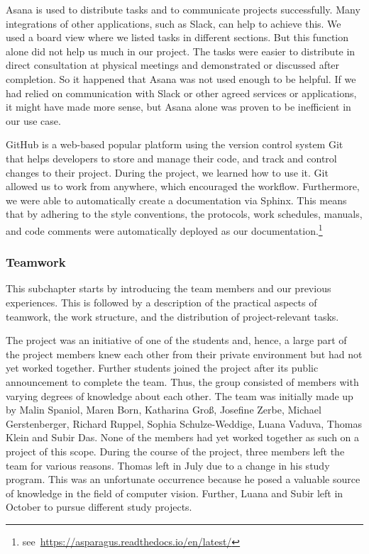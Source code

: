Asana is used to distribute tasks and to communicate projects successfully. Many integrations of other applications, such as Slack, can help to achieve this. We used a board view where we listed tasks in different sections. But this function alone did not help us much in our project. The tasks were easier to distribute in direct consultation at physical meetings and demonstrated or discussed after completion. So it happened that Asana was not used enough to be helpful. If we had relied on communication with Slack or other agreed services or applications, it might have made more sense, but Asana alone was proven to be inefficient in our use case.

GitHub is a web-based popular platform using the version control system Git that helps developers to store and manage their code, and track and control changes to their project. During the project, we learned how to use it. Git allowed us to work from anywhere, which encouraged the workflow. Furthermore, we were able to automatically create a documentation via Sphinx. This means that by adhering to the style conventions, the protocols, work schedules, manuals, and code comments were automatically deployed as our documentation.\footnote{see~\url{https://asparagus.readthedocs.io/en/latest/}}


\subsubsection{Teamwork}
\label{subsec:Teamwork}

This subchapter starts by introducing the team members and our previous experiences. This is followed by a description of the practical aspects of teamwork, the work structure, and the distribution of project-relevant tasks.

\bigskip
The project was an initiative of one of the students and, hence, a large part of the project members knew each other from their private environment but had not yet worked together. Further students joined the project after its public announcement to complete the team. Thus, the group consisted of members with varying degrees of knowledge about each other. The team was initially made up by Malin Spaniol, Maren Born, Katharina Groß, Josefine Zerbe, Michael Gerstenberger, Richard Ruppel, Sophia Schulze-Weddige, Luana Vaduva, Thomas Klein and Subir Das. None of the members had yet worked together as such on a project of this scope. During the course of the project, three members left the team for various reasons. Thomas left in July due to a change in his study program. This was an unfortunate occurrence because he posed a valuable source of knowledge in the field of computer vision. Further, Luana and Subir left in October to pursue different study projects.

